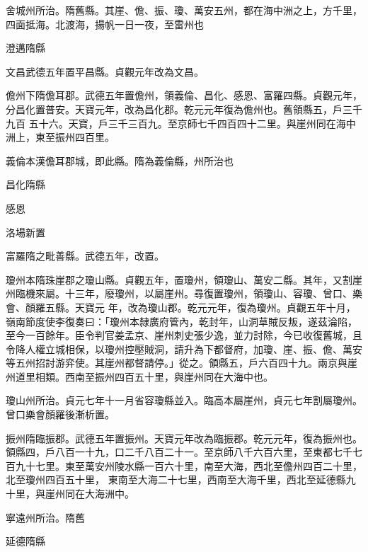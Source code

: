 \begin{pinyinscope}
 舍城州所治。隋舊縣。其崖、儋、振、瓊、萬安五州，都在海中洲之上，方千里，四面抵海。北渡海，揚帆一日一夜，至雷州也



 澄邁隋縣



 文昌武德五年置平昌縣。貞觀元年改為文昌。



 儋州下隋儋耳郡。武德五年置儋州，領義倫、昌化、感恩、富羅四縣。貞觀元年，分昌化置普安。天寶元年，改為昌化郡。乾元元年復為儋州也。舊領縣五，戶三千九百
 五十六。天寶，戶三千三百九。至京師七千四百四十二里。與崖州同在海中洲上，東至振州四百里。



 義倫本漢儋耳郡城，即此縣。隋為義倫縣，州所治也



 昌化隋縣



 感恩



 洛場新置



 富羅隋之毗善縣。武德五年，改置。



 瓊州本隋珠崖郡之瓊山縣。貞觀五年，置瓊州，領瓊山、萬安二縣。其年，又割崖州臨機來屬。十三年，廢瓊州，以屬崖州。尋復置瓊州，領瓊山、容瓊、曾口、樂會、顏羅五縣。天寶元
 年，改為瓊山郡。乾元元年，復為瓊州。貞觀五年十月，嶺南節度使李復奏曰：「瓊州本隸廣府管內，乾封年，山洞草賊反叛，遂茲淪陷，至今一百餘年。臣令判官姜孟京、崖州刺史張少逸，並力討除，今已收復舊城，且令降人權立城相保，以瓊州控壓賊洞，請升為下都督府，加瓊、崖、振、儋、萬安等五州招討游弈使。其崖州都督請停。」從之。領縣五，戶六百四十九。兩京與崖州道里相類。西南至振州四百五十里，與崖州同在大海中也。



 瓊山州所治。貞元七年十一月省容瓊縣並入。臨高本屬崖州，貞元七年割屬瓊州。曾口樂會顏羅後漸析置。



 振州隋臨振郡。武德五年置振州。天寶元年改為臨振郡。乾元元年，復為振州也。領縣四，戶八百一十九，口二千八百二十一。至京師八千六百六里，至東都七千七百九十七里。東至萬安州陵水縣一百六十里，南至大海，西北至儋州四百二十里，北至瓊州四百五十里，
 東南至大海二十七里，西南至大海千里，西北至延德縣九十里，與崖州同在大海洲中。



 寧遠州所治。隋舊



 延德隋縣




\end{pinyinscope}
